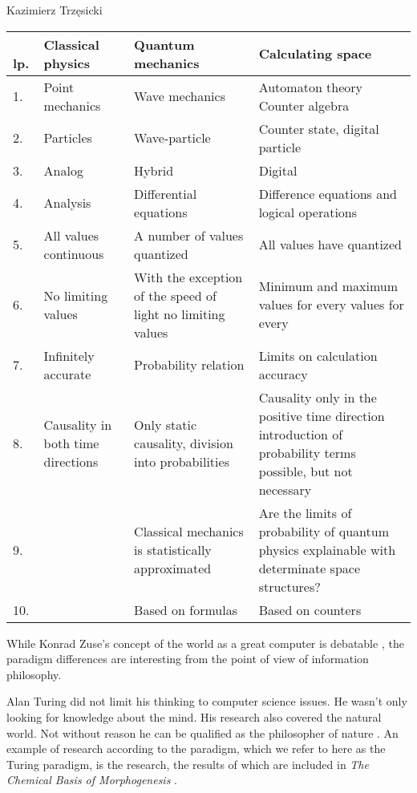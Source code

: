 \begin{artengenv}{Kazimierz Trzęsicki}
\noindent\begin{footnotesize}
\begin{tabularx}{\textwidth}{|l|X|X|X|}
  \hline \
   \bf{lp.}& \bf{Classical physics } &  \bf{Quantum mechanics} &  \bf{Calculating space} \\\hline
1.& Point mechanics  & Wave mechanics  & Automaton theory Counter algebra  \\\hline
2.& Particles  & Wave-particle  & Counter state, digital particle \\\hline
3.& Analog & Hybrid & Digital \\\hline
4.& Analysis & Differential equations  & Difference equations and logical operations \\\hline
5.& All values continuous & A number of values quantized & All values have quantized \\\hline
6.& No limiting  values & With the exception of the speed of light no limiting values & Minimum and maximum values for every values for every \\\hline
7.&  Infinitely accurate  & Probability relation   & Limits on calculation accuracy \\\hline
8.&  Causality in both time directions & Only static causality, division into probabilities  & Causality only in the positive time direction introduction of probability terms possible, but not necessary \\\hline
9.& & Classical mechanics is statistically approximated & Are the limits of  probability of quantum physics explainable with determinate space structures? \\\hline
10.& & Based on formulas & Based on counters \\\hline
\end{tabularx}
\end{footnotesize}


While Konrad Zuse's concept of the world as a great computer is debatable \parencite[paragraphs: ``Zuse thesis'', and ``Examining Zuse's thesis'']{CopelandSprevakShagrir2017}, the paradigm differences are interesting from the point of view of information philosophy.

Alan Turing did not limit his thinking to computer science issues. He wasn't only looking for knowledge about the mind. His research also covered the natural world. Not without reason he can be qualified as the philosopher of nature \parencite{Hodges1997}. An example of research according to the paradigm, which we refer to here as the Turing paradigm, is the research, the results of which are included in \emph{The Chemical Basis of Morphogenesis} \parencite*{Turing1952a}.


\end{artengenv}
